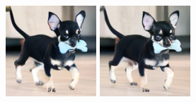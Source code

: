 \begin{figure}[h]
\begin{minipage}{0.15\textwidth}
    \end{minipage}
    \begin{minipage}{0.15\textwidth}
        \centering
        \includegraphics[width=\linewidth]{material/1k/118.png}
    \end{minipage}
    \begin{minipage}{0.15\textwidth}
        \centering
        \includegraphics[width=\linewidth]{material/8k/118.png}

\end{minipage}
\end{figure}
